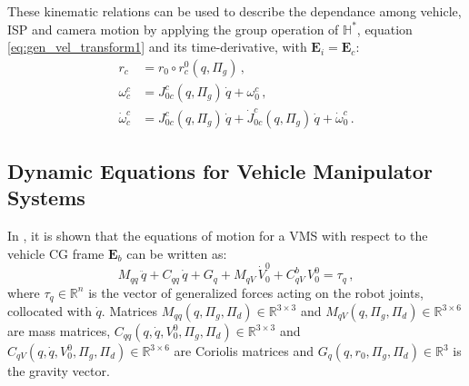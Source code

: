 These kinematic relations can be used to describe the dependance among vehicle, ISP and camera motion by applying the group operation of $\mathbb{H}^*$, equation
\eqref{eq:gen_vel_transform1} and its time-derivative, with $\mathbf{E}_i = \mathbf{E}_c$:
%
\begin{align}
r_{c} &= r_{0} \circ r^0_{c}(q,\Pi_g) \,, \label{eq:camera_orientation1} \\
\omega^{c}_{c} &= J^{c}_{0c}(q,\Pi_g) \, \dot{q} + \omega^{c}_{0} \,, \label{eq:camera_orientation2} \\
\dot{\omega}^{c}_{c} &= J^{c}_{0c}(q,\Pi_g) \, \dot{q} + \dot{J}^{c}_{0c}(q,\Pi_g) \, \dot{q} + \dot{\omega}^{c}_{0} \,. \label{eq:camera_orientation3}
\end{align}
%

\subsection{Dynamic Equations for Vehicle Manipulator Systems}
\label{sec:NE_algorithm}

In \cite{Gravdahl2014}, it is shown that the equations of motion for a VMS with respect to the vehicle CG frame $\mathbf{E}_{b}$ can be written as:
%
%
\begin{equation}
M_{qq}\,\ddot{q} + C_{qq}\,\dot{q} + G_{q} + M_{qV}\,\dot{V}^{0}_{0} + C^{b}_{qV}\,V^{0}_{0} = \tau_q \,,
\label{eq:HEADS_dynamics}
\end{equation}
%
where $\tau_q \in \mathbb{R}^{n}$ is the vector of generalized forces acting on the robot joints, collocated with $\dot{q}$.
%
Matrices $M_{qq}(q,\Pi_g,\Pi_d) \in \mathbb{R}^{3 \times 3}$ and $M_{qV}(q,\Pi_g,\Pi_d) \in \mathbb{R}^{3 \times 6}$ are mass matrices,
%
$C_{qq}(q,\dot{q},V^{0}_{0},\Pi_g,\Pi_d) \in \mathbb{R}^{3 \times 3}$ and $C_{qV}(q,\dot{q},V^{0}_{0},\Pi_g,\Pi_d) \in \mathbb{R}^{3 \times 6}$ are Coriolis matrices 
%
and $G_{q}(q,r_{0},\Pi_g,\Pi_d) \in \mathbb{R}^{3}$ is the gravity vector.


